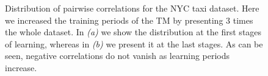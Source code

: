 \documentclass[11pt,letterpaper]{article}
\begin{document}
		    \begin{figure}[t]
			    \centering
			    \caption{
			        Distribution of pairwise correlations for the NYC taxi dataset.
			        Here we increased the training periods of the TM by presenting 3 times
			        the whole dataset. In \emph{(a)} we show the distribution at the
			        first stages of learning, whereas in \emph{(b)} we present it at
			        the last stages. As can be seen, negative correlations do not
			        vanish as learning periods increase.
			    }
			    \label{fig11-1}
		    \end{figure}
\end{document}
